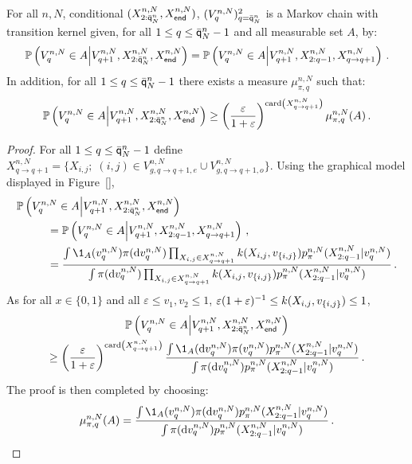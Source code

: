 \begin{lemma}
\label{lem:minorization}
For all $n,N$, conditional  $(X_{2:\bar{\mathsf{q}}^{n}_{N}}^{n,N},X_{\mathsf{end}}^{n,N})$, $(V_{q}^{n,N})_{q=\bar{\mathsf{q}}^{n}_{N}}^2$ is a Markov chain with transition kernel given, for all $1\le q \le \bar{\mathsf{q}}^{n}_{N}-1$ and all measurable set $A$, by:
\[
\mathbb{P}\left(V^{n,N}_{q}\in A\middle|V^{n,N}_{q+1},X_{2:\bar{\mathsf{q}}^{n}_{N}}^{n,N},X_{\mathsf{end}}^{n,N}\right) = \mathbb{P}\left(V^{n,N}_{q}\in A\middle|V^{n,N}_{q+1},X^{n,N}_{2:q-1},X^{n,N}_{q\to q+1}\right)\,.
\]
In addition,  for all $1\le q \le \bar{\mathsf{q}}^{n}_{N}-1$ there exists a measure $\mu^{n,N}_{\pi,q}$ such that:
\[
\mathbb{P}\left(V^{n,N}_{q}\in A\middle|V^{n,N}_{q+1},X_{2:\bar{\mathsf{q}}^{n}_{N}}^{n,N},X_{\mathsf{end}}^{n,N}\right)\ge \left(\frac{\varepsilon}{1+\varepsilon}\right)^{\mathrm{card}\left(X^{n,N}_{q\to q+1}\right)} \mu^{n,N}_{\pi,q}(A)\,.
\] 
\end{lemma}
\begin{proof}
For all $1\le q \le \bar{\mathsf{q}}^{n}_{N}-1$ define $X^{n,N}_{q\to q+1} = \{X_{i,j};\;(i,j)\in V^{n,N}_{g,q\to q+1,e}\cup V^{n,N}_{g,q\to q+1,o}\}$. Using the graphical model displayed in Figure~\ref{}, 
\begin{align*}
\mathbb{P}\left(V^{n,N}_{q}\in A\middle|V^{n,N}_{q+1},X_{2:\ordermax{n}{N}}^{n,N},X_{\mathsf{end}}^{n,N}\right) &\\
 &\hspace{-4.2cm}= \mathbb{P}\left(V^{n,N}_{q}\in A\middle|V^{n,N}_{q+1},X^{n,N}_{2:q-1},X^{n,N}_{q\to q+1}\right)\eqsp,\\
 &\hspace{-4.2cm}= \frac{\int \1_{A}(v^{n,N}_{q})\pi(\rmd v^{n,N}_{q})\prod_{X_{i,j}\in X^{n,N}_{q\to q+1}}\condlik(X_{i,j},v_{\{i,j\}})p_{\pi}^{n,N}(X^{n,N}_{2:q-1}|v^{n,N}_{q})}{\int \pi(\rmd v^{n,N}_{q})\prod_{X_{i,j}\in X^{n,N}_{q\to q+1}}\condlik(X_{i,j},v_{\{i,j\}})p_{\pi}^{n,N}(X^{n,N}_{2:q-1}|v^{n,N}_{q})}\eqsp.
\end{align*}
As for all $x\in\{0,1\}$ and all $\varepsilon\le v_1,v_2\le 1$, $\varepsilon(1+\varepsilon)^{-1}\le k(X_{i,j},v_{\{i,j\}})\le 1$,
\begin{multline*}
\mathbb{P}\left(V^{n,N}_{q}\in A\middle|V^{n,N}_{q+1},X_{2:\ordermax{n}{N}}^{n,N},X_{\mathsf{end}}^{n,N}\right)\\
\ge \left(\frac{\varepsilon}{1+\varepsilon}\right)^{\card\left(X^{n,N}_{q\to q+1}\right)}\frac{\int \1_{A}(\rmd v^{n,N}_{q})\pi(v^{n,N}_{q})p_{\pi}^{n,N}(X^{n,N}_{2:q-1}|v^{n,N}_{q})}{\int \pi(\rmd v^{n,N}_{q})p_{\pi}^{n,N}(X^{n,N}_{2:q-1}|v^{n,N}_{q})}\eqsp. 
\end{multline*}
The proof is then completed by choosing:
\[
\mu^{n,N}_{\pi,q}(A) = \frac{\int \1_{A}(v^{n,N}_{q})\pi(\rmd v^{n,N}_{q})p_{\pi}^{n,N}(X^{n,N}_{2:q-1}|v^{n,N}_{q})}{\int \pi(\rmd v^{n,N}_{q})p_{\pi}^{n,N}(X^{n,N}_{2:q-1}|v^{n,N}_{q})}\eqsp. 
\]
\end{proof}
